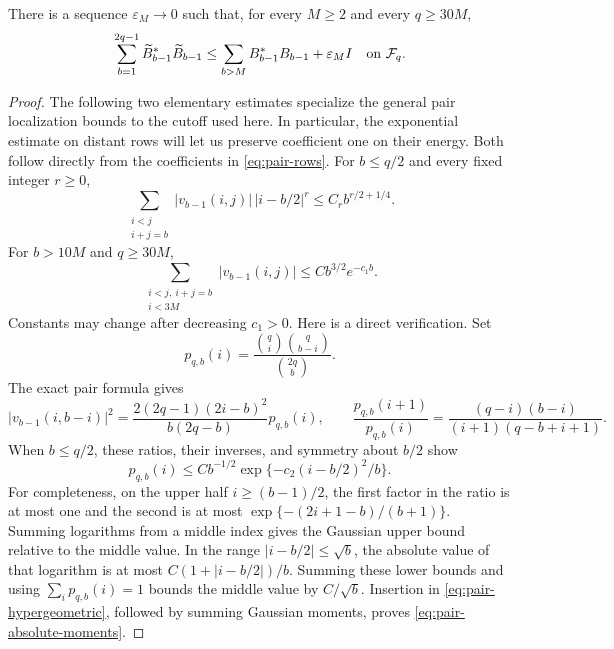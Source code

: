 \begin{lemma}\label{lem:evacuation-rows}
There is a sequence $\varepsilon_M\to0$ such that, for every $M\ge2$
and every $q\ge30M$,
\begin{equation}\label{eq:evacuation-rows}
 \sum_{b=1}^{2q-1}\widetilde B_{b-1}^*\widetilde B_{b-1}
 \le\sum_{b>M}B_{b-1}^*B_{b-1}+\varepsilon_MI
 \quad\hbox{on }\mathcal F_q.
\end{equation}
\end{lemma}
\begin{proof}
The following two elementary estimates specialize the general pair
localization bounds to the cutoff used here.  In particular, the
exponential estimate on distant rows will let us preserve coefficient
one on their energy.  Both follow directly from the coefficients in
\eqref{eq:pair-rows}.  For $b\le q/2$ and every fixed integer $r\ge0$,
\begin{equation}\label{eq:pair-absolute-moments}
 \sum_{\substack{i<j\\i+j=b}}|v_{b-1}(i,j)|\,|i-b/2|^r
 \le C_r b^{r/2+1/4}.
\end{equation}
For $b>10M$ and $q\ge30M$,
\begin{equation}\label{eq:pair-remote-tail}
 \sum_{\substack{i<j,\ i+j=b\\i<3M}}|v_{b-1}(i,j)|
 \le Cb^{3/2}e^{-c_1b}.
\end{equation}
Constants may change after decreasing $c_1>0$.
Here is a direct verification.  Set
\[
 p_{q,b}(i)=\frac{\binom qi\binom q{b-i}}{\binom{2q}b}.
\]
The exact pair formula gives
\begin{equation}\label{eq:pair-hypergeometric}
 |v_{b-1}(i,b-i)|^2
 =\frac{2(2q-1)(2i-b)^2}{b(2q-b)}p_{q,b}(i),
 \qquad
 \frac{p_{q,b}(i+1)}{p_{q,b}(i)}
 =\frac{(q-i)(b-i)}{(i+1)(q-b+i+1)}.
\end{equation}
When $b\le q/2$, these ratios, their inverses, and symmetry about $b/2$
show
\[
 p_{q,b}(i)\le Cb^{-1/2}
                  \exp\{-c_2(i-b/2)^2/b\}.
\]
For completeness, on the upper half $i\ge(b-1)/2$, the first factor
in the ratio is at most one and the second is at most
$\exp\{-(2i+1-b)/(b+1)\}$.  Summing logarithms from a middle
index gives the Gaussian upper bound relative to the middle value.  In the range $|i-b/2|\le\sqrt b$, the absolute value of
that logarithm is at most $C(1+|i-b/2|)/b$.  Summing these lower bounds and
using $\sum_i p_{q,b}(i)=1$ bounds the middle value by $C/\sqrt b$.
Insertion in \eqref{eq:pair-hypergeometric}, followed by summing Gaussian
moments, proves \eqref{eq:pair-absolute-moments}.


\end{proof}
